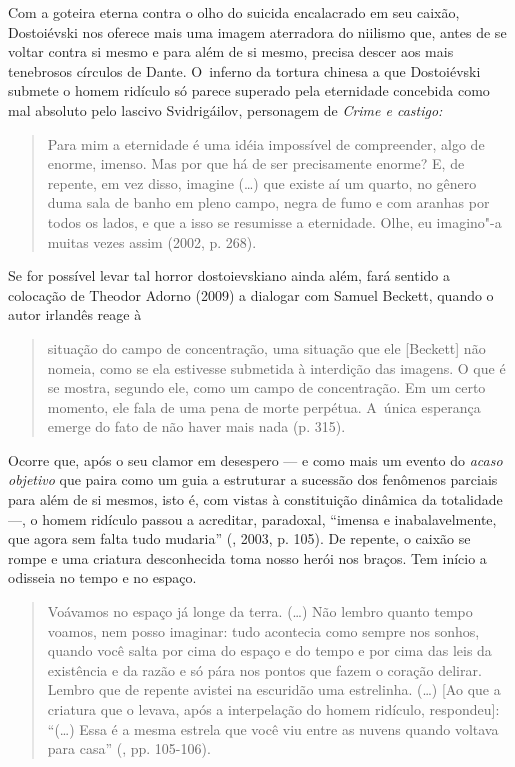 Com a goteira eterna contra o olho do suicida encalacrado em seu caixão,
Dostoiévski nos oferece mais uma imagem aterradora do niilismo que,
antes de se voltar contra si mesmo e para além de si mesmo, precisa
descer aos mais tenebrosos círculos de Dante. O~inferno da tortura
chinesa a que Dostoiévski submete o homem ridículo só parece superado
pela eternidade concebida como mal absoluto pelo lascivo Svidrigáilov,
personagem de \emph{Crime e castigo: }

\begin{quote}
Para mim a eternidade é uma idéia impossível de compreender, algo de
enorme, imenso. Mas por que há de ser precisamente enorme? E, de
repente, em vez disso, imagine (\ldots{}) que existe aí um quarto, no
gênero duma sala de banho em pleno campo, negra de fumo e com aranhas
por todos os lados, e que a isso se resumisse a eternidade. Olhe, eu
imagino"-a muitas vezes assim (2002, p. 268).
\end{quote}

Se for possível levar tal horror dostoievskiano ainda além, fará sentido
a colocação de Theodor Adorno (2009) a dialogar com Samuel Beckett,
quando o autor irlandês reage à

\begin{quote}
situação do campo de concentração, uma situação que ele {[}Beckett{]}
não nomeia, como se ela estivesse submetida à interdição das imagens. O
que é se mostra, segundo ele, como um campo de concentração. Em um certo
momento, ele fala de uma pena de morte perpétua. A~única esperança
emerge do fato de não haver mais nada (p. 315).
\end{quote}

Ocorre que, após o seu clamor em desespero --- e como mais um evento do
\emph{acaso objetivo} que paira como um guia a estruturar a sucessão dos
fenômenos parciais para além de si mesmos, isto é, com vistas à
constituição dinâmica da totalidade ---, o homem ridículo passou a
acreditar, paradoxal, ``imensa e inabalavelmente, que agora sem falta
tudo mudaria'' (, 2003, p. 105). De repente, o caixão se
rompe e uma criatura desconhecida toma nosso herói nos braços. Tem
início a odisseia no tempo e no espaço.

\begin{quote}
Voávamos no espaço já longe da terra. (\ldots) Não lembro quanto tempo
voamos, nem posso imaginar: tudo acontecia como sempre nos sonhos,
quando você salta por cima do espaço e do tempo e por cima das leis da
existência e da razão e só pára nos pontos que fazem o coração delirar.
Lembro que de repente avistei na escuridão uma estrelinha. (\ldots) {[}Ao
que a criatura que o levava, após a interpelação do homem ridículo,
respondeu{]}: ``(\ldots) Essa é a mesma estrela que você viu entre as
nuvens quando voltava para casa'' (, pp. 105-106).
\end{quote}

